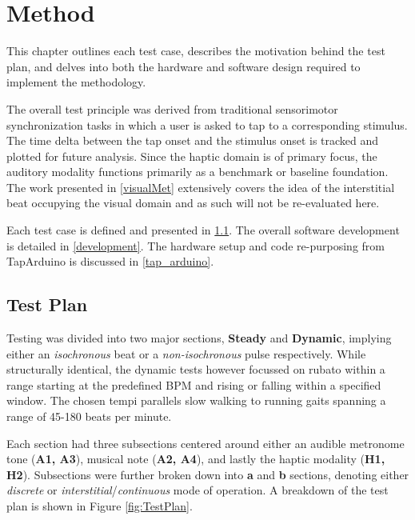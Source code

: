 \chapter{Method}
This chapter outlines each test case, describes the motivation behind the test plan, and delves into both the hardware and software design required to implement the methodology. 

The overall test principle was derived from traditional sensorimotor synchronization tasks in which a user is asked to tap to a corresponding stimulus. The time delta between the tap onset and the stimulus onset is tracked and plotted for future analysis. Since the haptic domain is of primary focus, the auditory modality functions primarily as a benchmark or baseline foundation.  The work presented in \ref{visualMet} extensively covers the idea of the interstitial beat occupying the visual domain and as such will not be re-evaluated here.


Each test case is defined and presented in \ref{testPlan}. The overall software development is detailed in \ref{development}. The hardware setup and code re-purposing from TapArduino is discussed in \ref{tap_arduino}.

\section{Test Plan} \label{testPlan}
Testing was divided into two major sections, \textbf{Steady} and \textbf{Dynamic}, implying either an \textit{isochronous} beat or a \textit{non-isochronous} pulse respectively. While structurally identical, the dynamic tests however focussed on rubato within a range starting at the predefined BPM and rising or falling within a specified window. The chosen tempi parallels slow walking to running gaits spanning a range of 45-180 beats per minute.

Each section had three subsections centered around either an audible metronome tone (\textbf{A1, A3}), musical note (\textbf{A2, A4}), and lastly the haptic modality (\textbf{H1, H2}). Subsections were further broken down into \textbf{a} and \textbf{b} sections, denoting either \textit{discrete} or \textit{interstitial}/\textit{continuous} mode of operation. A breakdown of the test plan is shown in Figure \ref{fig:TestPlan}.

